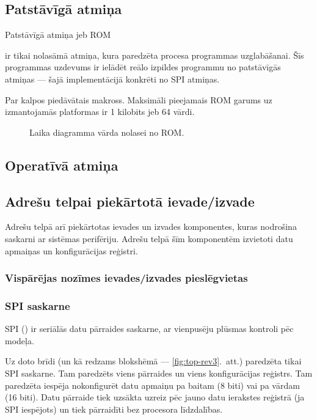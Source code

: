 \subsection{Patstāvīgā atmiņa} \label{sec:rom}
	Patstāvīgā atmiņa jeb ROM
	
	 ir tikai nolasāmā atmiņa, kura paredzēta
	 procesa programmas uzglabāšanai.
	Šīs programmas uzdevums ir ielādēt reālo izpildes programmu no
	patstāvīgās atmiņas — šajā implementācijā konkrēti 
	no SPI  atmiņas.
	
	Par  kalpos  piedāvātais
	 makross.\cite{FlashROM}
	Maksimāli pieejamais ROM garums uz izmantojamās platformas ir
	1 kilobits jeb 64 vārdi.\cite{FusionGuide}
	
	\todo
	
	\begin{figure}[thp]
		\centering
		\def\svgwidth{\textwidth}
		{\ttfamily\small}
		\caption{Laika diagramma vārda nolasei no ROM.}
		\label{fig:rom-time-diag}
	\end{figure}

\subsection{Operatīvā atmiņa}
	\todo

\subsection{Adrešu telpai piekārtotā ievade/izvade}
	Adrešu telpā arī piekārtotas ievades un izvades komponentes,
	kuras nodrošina saskarni ar sistēmas perifēriju. Adrešu telpā šīm
	komponentēm izvietoti datu apmaiņas un konfigurācijas reģistri.
	
	\subsubsection{Vispārējas nozīmes ievades/izvades pieslēgvietas}
	\todo
	
	\subsubsection{SPI saskarne}
	SPI () ir seriālās
	datu pārraides saskarne, ar vienpusēju plūsmas kontroli pēc
	 modeļa.
	
	
	
	Uz doto brīdi (un kā redzams blokshēmā — \ref{fig:top-rev3}.~att.)
	paredzēta tikai SPI saskarne. Tam paredzēts viens pārraides un viens
	konfigurācijas reģistrs. Tam paredzēta iespēja nokonfigurēt datu
	apmaiņu pa baitam (8 biti) vai pa vārdam (16 biti). Datu pārraide tiek
	uzsākta uzreiz pēc jauno datu ierakstes reģistrā (ja SPI iespējots) un
	tiek pārraidīti bez procesora līdzdalības.
	
